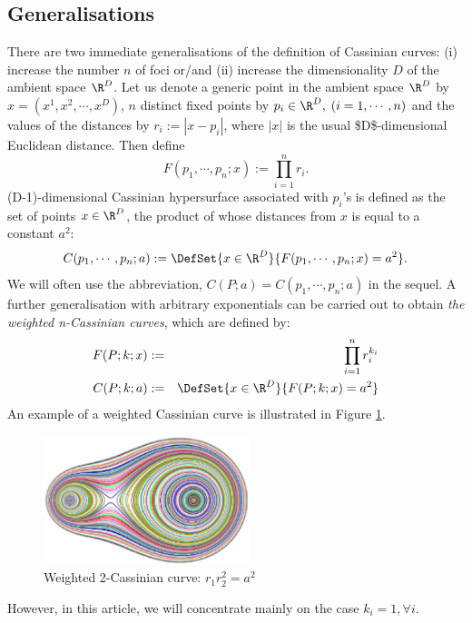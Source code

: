\documentclass{article}
\begin{document}
\subsection{Generalisations}
\label{sec:org5748dd2}
There are two immediate generalisations of the definition of Cassinian curves: (i) increase the number \(n\) of foci or/and (ii) increase the dimensionality \(D\) of the ambient space \(\R^{D}\). 
Let us denote a generic point in the ambient space \(\R^{D}\) by \(x =(x^1, x^2, \cdots, x^D)\), \(n\) distinct fixed points by \(p_i \in \R^D, \; (i=1,\cdots, n)\) 
and the values of the distances by \(r_i := |x-p_i|\), where \(|x|\) is the usual \$D\$-dimensional Euclidean distance.
 Then define 
\begin{equation}
\label{}
F(p_1,\cdots,p_n;x):=\prod_{i=1}^{n} r_i.
\end{equation}
(D-1)-dimensional Cassinian hypersurface associated with \(p_i\)'s is defined as the set of points \(x\in \R^D\), the product of whose distances from \(x\) is equal to a constant \(a^2\):
\begin{equation}
\label{ }
C(p_1,\cdots,p_n;a) :=\DefSet{x\in \R^D}{F(p_1,\cdots,p_n;x) = a^2 }.
\end{equation}
We will often use the abbreviation, \(C(P;a)=C(p_1,\cdots,p_n;a)\) in the sequel. 
A further generalisation with arbitrary exponentials can be carried out to obtain \emph{the weighted n-Cassinian curves}, which are defined by:
\begin{eqnarray}
F(P;k;x) & := & \prod_{i=1}^{n} r_i^{k_i} \nonumber\\
C(P;k;a) &:=&\DefSet{x\in \R^D}{F(P;k;x) = a^2 }
\end{eqnarray}
An example of a weighted Cassinian curve is illustrated in Figure \ref{fig:weighted_2_cass}.
\begin{figure}[h]
\begin{center}
\includegraphics[width=6cm]{images/cassini2_weighted.eps}
\caption{Weighted 2-Cassinian curve: $r_1 r_2^2 = a^2$}
\label{fig:weighted_2_cass}
\end{center}
\end{figure}
However, in this article, we will concentrate mainly on the case \(k_i = 1, \forall i\).
\end{document}
